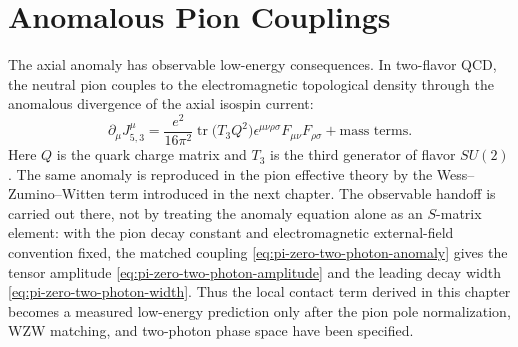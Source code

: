 \section{Anomalous Pion Couplings}

The axial anomaly has observable low-energy consequences.  In two-flavor QCD,
the neutral pion couples to the electromagnetic topological density through
the anomalous divergence of the axial isospin current:
\[
  \partial_\mu J_{5,3}^\mu
  =
  \frac{e^2}{16\pi^2}
  \operatorname{tr}\bigl(T_3 Q^2\bigr)
  \epsilon^{\mu\nu\rho\sigma}
  F_{\mu\nu}F_{\rho\sigma}
  +
  \text{mass terms}.
\]
Here \(Q\) is the quark charge matrix and \(T_3\) is the third generator of
flavor \(SU(2)\).  The same anomaly is reproduced in the pion effective theory
by the Wess--Zumino--Witten term introduced in the next chapter.  The
observable handoff is carried out there, not by treating the anomaly equation
alone as an \(S\)-matrix element: with the pion decay constant and
electromagnetic external-field convention fixed, the matched coupling
\eqref{eq:pi-zero-two-photon-anomaly} gives the tensor amplitude
\eqref{eq:pi-zero-two-photon-amplitude} and the leading decay width
\eqref{eq:pi-zero-two-photon-width}.  Thus the local contact term derived in
this chapter becomes a measured low-energy prediction only after the pion pole
normalization, WZW matching, and two-photon phase space have been specified.
